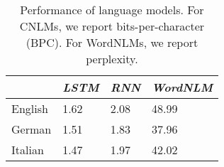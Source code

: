 \begin{table}[t]
  \begin{center}
    \begin{tabular}{l|l|l|l}
      \multicolumn{1}{c|}{}&\emph{LSTM}&\emph{RNN}&\emph{WordNLM}\\
      \hline
	    English & 1.62 & 2.08 & 48.99  \\
	    German &  1.51 & 1.83 & 37.96   \\
	    Italian & 1.47 & 1.97 & 42.02  \\
    \end{tabular}
  \end{center}
  \caption{\label{tab:lm-results} Performance of language models. For CNLMs, we report bits-per-character (BPC). For WordNLMs, we report perplexity.}
\end{table}






